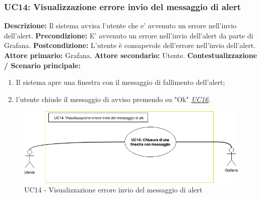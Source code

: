                     \clearpage
                
                \subsubsection{UC14: Visualizzazione errore invio del messaggio di alert}
                    \textbf{Descrizione:} Il sistema avvisa l'utente che e’ avvenuto un errore nell'invio dell'alert.
                    \newline
                    \textbf{Precondizione:} E’ avvenuto un errore nell'invio dell'alert da parte di Grafana.
                    \newline
                    \textbf{Postcondizione:} L’utente è consapevole dell'errore nell'invio dell'alert.
                    \newline
                    \textbf{Attore primario:} Grafana.
                    \newline
                    \textbf{Attore secondario:} Utente.
                    \newline
                    \textbf{Contestualizzazione / Scenario principale:} \begin{enumerate}
                            \item Il sistema apre una finestra con il messaggio di fallimento dell'alert;
                            \item l'utente chiude il messaggio di avviso premendo su "Ok" \underline{\textit{UC16}}.
                        \end{enumerate}
                        
                    \begin{figure}[!htbp]
                    	\centering
                    	\includegraphics[width=\textwidth]{UC14.png}
                    	\caption{UC14 - Visualizzazione errore invio del messaggio di alert}
                    	\label{uc11}
                    \end{figure}
                        

